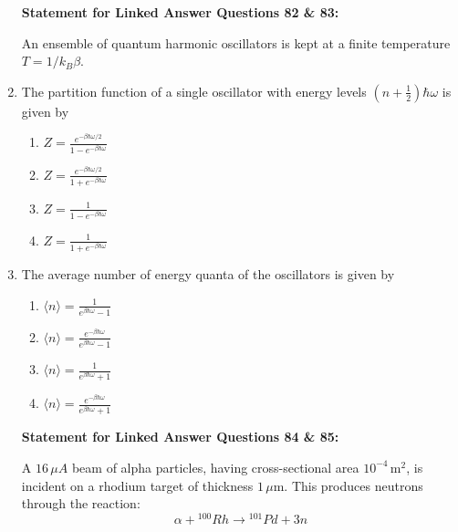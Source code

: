\documentclass[journal,12pt,onecolumn]{IEEEtran}
\theoremstyle{remark}
\begin{document}
\begin{enumerate}
\textbf{Statement for Linked Answer Questions 82 \& 83:}

An ensemble of quantum harmonic oscillators is kept at a finite temperature $T = 1/k_B \beta$.


    \item  The partition function of a single oscillator with energy levels $\left(n + \frac{1}{2}\right) \hbar \omega$ is given by
    \begin{multicols}{2}
    \begin{enumerate}
        \item $Z = \frac{e^{-\beta \hbar \omega / 2}}{1 - e^{-\beta \hbar \omega}}$\\
        \item $Z = \frac{e^{-\beta \hbar \omega / 2}}{1 + e^{-\beta \hbar \omega}}$
        \item $Z = \frac{1}{1 - e^{-\beta \hbar \omega}}$\\
        \item $Z = \frac{1}{1 + e^{-\beta \hbar \omega}}$
    \end{enumerate}
    \end{multicols}

    \item  The average number of energy quanta of the oscillators is given by
    \begin{multicols}{2}
    \begin{enumerate}
        \item $\langle n \rangle = \frac{1}{e^{\beta \hbar \omega} - 1}$\\
        \item $\langle n \rangle = \frac{e^{-\beta \hbar \omega}}{e^{\beta \hbar \omega} - 1}$
        \item $\langle n \rangle = \frac{1}{e^{\beta \hbar \omega} + 1}$\\
        \item $\langle n \rangle = \frac{e^{-\beta \hbar \omega}}{e^{\beta \hbar \omega} + 1}$
    \end{enumerate}
    \end{multicols}


\bigskip

\textbf{Statement for Linked Answer Questions 84 \& 85:}

A $16 \, \mu A$ beam of alpha particles, having cross-sectional area $10^{-4} \, \text{m}^2$, is incident on a rhodium target of thickness $1 \, \mu \text{m}$. This produces neutrons through the reaction:
\[
\alpha + {}^{100}Rh \rightarrow {}^{101}Pd + 3n
\]



\end{enumerate}
\end{document}
